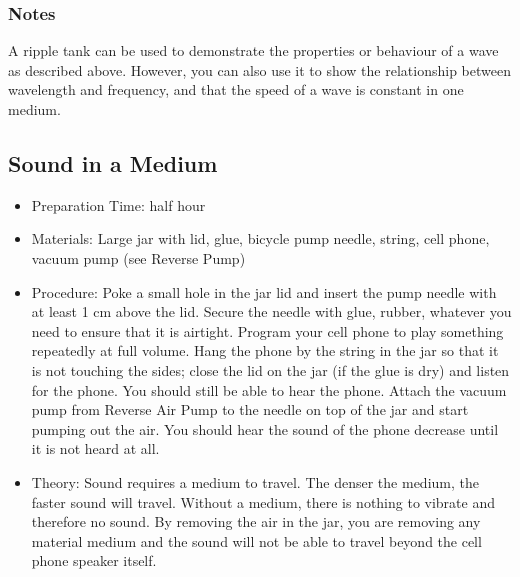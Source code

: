 \subsubsection*{Notes}
A ripple tank can be used to demonstrate the properties or behaviour of a wave as described above.  However, you can also use it to show the relationship between wavelength and frequency, and that the speed of a wave is constant in one medium.

	
	

\subsection{Sound in a Medium}
\begin{itemize}
\item{Preparation Time: half hour}
\item{Materials: Large jar with lid, glue, bicycle pump needle, string, cell phone, vacuum pump (see Reverse Pump)}
\item{Procedure: Poke a small hole in the jar lid and insert the pump needle with at least 1 cm above the lid. Secure the needle with glue, rubber, whatever you need to ensure that it is airtight. Program your cell phone to play something repeatedly at full volume. Hang the phone by the string in the jar so that it is not touching the sides; close the lid on the jar (if the glue is dry) and listen for the phone. You should still be able to hear the phone. Attach the vacuum pump from Reverse Air Pump to the needle on top of the jar and start pumping out the air. You should hear the sound of the phone decrease until it is not heard at all.}
\item{Theory: Sound requires a medium to travel. The denser the medium, the faster sound will travel. Without a medium, there is nothing to vibrate and therefore no sound. By removing the air in the jar, you are removing any material medium and the sound will not be able to travel beyond the cell phone speaker itself.}
\end{itemize}



